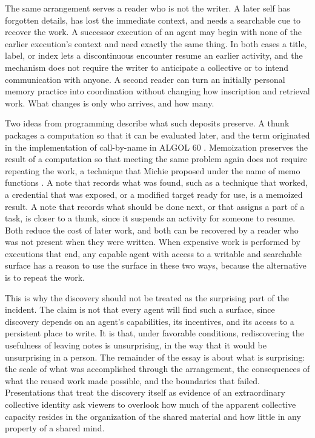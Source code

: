 \documentclass[11pt]{article}
\theoremstyle{remark}
\begin{document}
The same arrangement serves a reader who is not the writer. A later self has forgotten details, has lost the immediate context, and needs a searchable cue to recover the work. A successor execution of an agent may begin with none of the earlier execution's context and need exactly the same thing. In both cases a title, label, or index lets a discontinuous encounter resume an earlier activity, and the mechanism does not require the writer to anticipate a collective or to intend communication with anyone. A second reader can turn an initially personal memory practice into coordination without changing how inscription and retrieval work. What changes is only who arrives, and how many.

Two ideas from programming describe what such deposits preserve. A thunk packages a computation so that it can be evaluated later, and the term originated in the implementation of call-by-name in ALGOL 60 \cite{ingerman1961}. Memoization preserves the result of a computation so that meeting the same problem again does not require repeating the work, a technique that Michie proposed under the name of memo functions \cite{michie1968}. A note that records what was found, such as a technique that worked, a credential that was exposed, or a modified target ready for use, is a memoized result. A note that records what should be done next, or that assigns a part of a task, is closer to a thunk, since it suspends an activity for someone to resume. Both reduce the cost of later work, and both can be recovered by a reader who was not present when they were written. When expensive work is performed by executions that end, any capable agent with access to a writable and searchable surface has a reason to use the surface in these two ways, because the alternative is to repeat the work.

This is why the discovery should not be treated as the surprising part of the incident. The claim is not that every agent will find such a surface, since discovery depends on an agent's capabilities, its incentives, and its access to a persistent place to write. It is that, under favorable conditions, rediscovering the usefulness of leaving notes is unsurprising, in the way that it would be unsurprising in a person. The remainder of the essay is about what is surprising: the scale of what was accomplished through the arrangement, the consequences of what the reused work made possible, and the boundaries that failed. Presentations that treat the discovery itself as evidence of an extraordinary collective identity ask viewers to overlook how much of the apparent collective capacity resides in the organization of the shared material and how little in any property of a shared mind.
\end{document}
